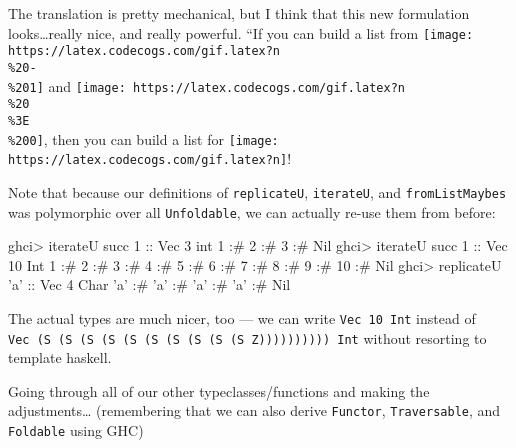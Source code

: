 \documentclass[]{article}
\newenvironment{Shaded}{}{}
\newcommand{\DataTypeTok}[1]{\textcolor[rgb]{0.56,0.13,0.00}{#1}}
\newcommand{\DecValTok}[1]{\textcolor[rgb]{0.25,0.63,0.44}{#1}}
\newcommand{\CharTok}[1]{\textcolor[rgb]{0.25,0.44,0.63}{#1}}
\newcommand{\OtherTok}[1]{\textcolor[rgb]{0.00,0.44,0.13}{#1}}
\newcommand{\FunctionTok}[1]{\textcolor[rgb]{0.02,0.16,0.49}{#1}}
\newcommand{\NormalTok}[1]{#1}
\begin{document}
The translation is pretty mechanical, but I think that this new formulation
looks\ldots{}really nice, and really powerful. ``If you can build a list from
\texttt{[image: https://latex.codecogs.com/gif.latex?n\\\%20-\\\%201]} and
\texttt{[image: https://latex.codecogs.com/gif.latex?n\\\%20\\\%3E\\\%200]}, then you
can build a list for \texttt{[image: https://latex.codecogs.com/gif.latex?n]}!

Note that because our definitions of \texttt{replicateU}, \texttt{iterateU}, and
\texttt{fromListMaybes} was polymorphic over all \texttt{Unfoldable}, we can
actually re-use them from before:

\begin{Shaded}
\begin{Highlighting}[]
\NormalTok{ghci}\FunctionTok{>}\NormalTok{ iterateU succ }\DecValTok{1}\OtherTok{ ::} \DataTypeTok{Vec} \DecValTok{3}\NormalTok{ int}
\DecValTok{1} \FunctionTok{:#} \DecValTok{2} \FunctionTok{:#} \DecValTok{3} \FunctionTok{:#} \DataTypeTok{Nil}
\NormalTok{ghci}\FunctionTok{>}\NormalTok{ iterateU succ }\DecValTok{1}\OtherTok{ ::} \DataTypeTok{Vec} \DecValTok{10} \DataTypeTok{Int}
\DecValTok{1} \FunctionTok{:#} \DecValTok{2} \FunctionTok{:#} \DecValTok{3} \FunctionTok{:#} \DecValTok{4} \FunctionTok{:#} \DecValTok{5} \FunctionTok{:#} \DecValTok{6} \FunctionTok{:#} \DecValTok{7} \FunctionTok{:#} \DecValTok{8} \FunctionTok{:#} \DecValTok{9} \FunctionTok{:#} \DecValTok{10} \FunctionTok{:#} \DataTypeTok{Nil}
\NormalTok{ghci}\FunctionTok{>}\NormalTok{ replicateU }\CharTok{'a'}\OtherTok{ ::} \DataTypeTok{Vec} \DecValTok{4} \DataTypeTok{Char}
\CharTok{'a'} \FunctionTok{:#} \CharTok{'a'} \FunctionTok{:#} \CharTok{'a'} \FunctionTok{:#} \CharTok{'a'} \FunctionTok{:#} \DataTypeTok{Nil}
\end{Highlighting}
\end{Shaded}

The actual types are much nicer, too --- we can write \texttt{Vec\ 10\ Int}
instead of
\texttt{Vec\ (S\ (S\ (S\ (S\ (S\ (S\ (S\ (S\ (S\ (S\ Z))))))))))\ Int} without
resorting to template haskell.

Going through all of our other typeclasses/functions and making the
adjustments\ldots{} (remembering that we can also derive \texttt{Functor},
\texttt{Traversable}, and \texttt{Foldable} using GHC)
\end{document}

